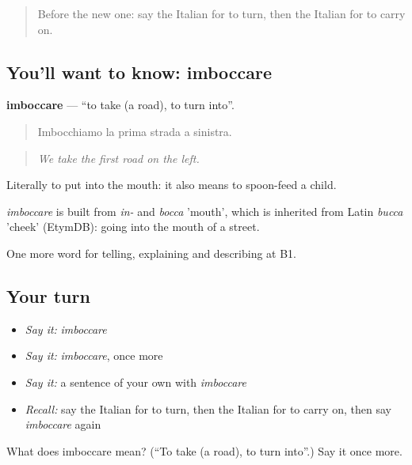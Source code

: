 \label{lesson:IT-C440-imboccare}



\begin{quote}
Before the new one: say the Italian for to turn, then the Italian for to carry on.
\end{quote}

\subsection*{You'll want to know: imboccare}
\textbf{imboccare} — \textquotedblleft{}to take (a road), to turn into\textquotedblright{}.

\begin{quote}
Imbocchiamo la prima strada a sinistra.
\end{quote}

\begin{quote}
\emph{We take the first road on the left.}
\end{quote}

Literally to put into the mouth: it also means to spoon-feed a child.

\begin{cousinweb}
\emph{imboccare} is built from \emph{in-} and \emph{bocca} 'mouth', which is inherited from Latin \emph{bucca} 'cheek' (EtymDB): going into the mouth of a street.
\end{cousinweb}

\begin{grammarlens}[title={What you've built}]
One more word for telling, explaining and describing at B1.
\end{grammarlens}

\subsection*{Your turn}
\begin{itemize}
\raggedright
  \item \emph{Say it:} \emph{imboccare}
  \item \emph{Say it:} \emph{imboccare}, once more
  \item \emph{Say it:} a sentence of your own with \emph{imboccare}
  \item \emph{Recall:} say the Italian for to turn, then the Italian for to carry on, then say \emph{imboccare} again
\end{itemize}

\begin{tcolorbox}[breakable,colback=teal!4,colframe=teal!35!black,title={Before you move on}]
What does imboccare mean? (\textquotedblleft{}To take (a road), to turn into\textquotedblright{}.) Say it once more.
\end{tcolorbox}
